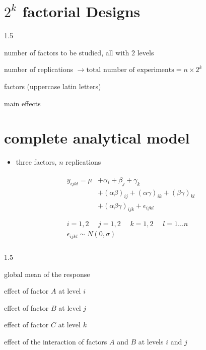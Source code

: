 \documentclass[
  a4paper,
]{scrbook}
\providecommand{\tightlist}{%
  \setlength{\itemsep}{0pt}\setlength{\parskip}{0pt}}\usepackage{longtable,booktabs,array}
\let\olddescription\description
\let\endolddescription\enddescription
\renewenvironment{description}{
          \begin{spacing}{1.5}\olddescription
        }{
          \endolddescription\end{spacing}
        }
\begin{document}
\section{\texorpdfstring{\(2^k\) factorial
Designs}{2\^{}k factorial Designs}}\label{k-factorial-designs}

\begin{description}
\item[\(k\)]
number of factors to be studied, all with \(2\) levels
\item[\(n\)]
number of replications
\(\rightarrow \text{total number of experiments} = n \times 2^k\)
\item[\(A,B, \ldots\)]
factors (uppercase latin letters)
\item[\(\alpha, \beta, \ldots\)]
main effects
\end{description}

\section{complete analytical model}\label{complete-analytical-model}

\begin{itemize}
\tightlist
\item
  three factors, \(n\) replications
\end{itemize}

\begin{align}
\begin{split}
y_{ijkl} = \mu &+ \alpha_i + \beta_j + \gamma_k\\
&+ (\alpha\beta)_{ij} + (\alpha\gamma)_{ik} + (\beta\gamma)_{kl}\\
&+(\alpha\beta\gamma)_{ijk}+\epsilon_{ijkl} \\
\end{split}\\
\begin{split}
i = 1,2 \phantom{=} j = 1,2 \phantom{=} k = 1,2 \phantom{=} l = 1 \ldots n \\
\epsilon_{ijkl} \sim N(0,\sigma)
\end{split} \nonumber \\
\end{align}

\begin{description}
\item[\(\mu\)]
global mean of the response
\item[\(\alpha_i\)]
effect of factor \(A\) at level \(i\)
\item[\(\beta_j\)]
effect of factor \(B\) at level \(j\)
\item[\(\gamma_k\)]
effect of factor \(C\) at level \(k\)
\item[\((\alpha\beta)_{ij}\)]
effect of the interaction of factors \(A\) and \(B\) at levels \(i\) and
\(j\)
\end{description}
\end{document}
